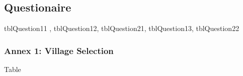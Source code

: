 \documentclass[letterpaper,10pt,english,openany,oneside]{sphinxmanual}
\begin{document}
\begin{sphinxVerbatim}[commandchars=\\\{\}]
  
  
    
    
  
  
     
     
\end{sphinxVerbatim}


\subsection{Questionaire}
\label{\detokenize{module/module:questionaire}}
\sphinxAtStartPar
tblQuestion11 , tblQuestion12, tblQuestion21, tblQuestion13, tblQuestion22


\subsubsection{Annex 1: Village Selection}
\label{\detokenize{module/module:annex-1-village-selection}}
\sphinxAtStartPar
Table
\end{document}
